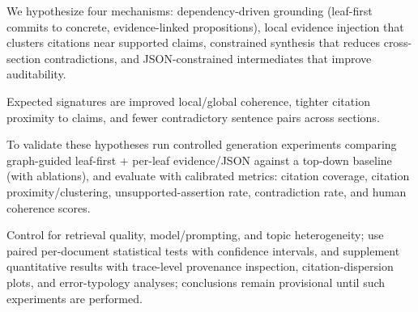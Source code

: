 We hypothesize four mechanisms: dependency-driven grounding (leaf-first commits to concrete, evidence-linked propositions), local evidence injection that clusters citations near supported claims, constrained synthesis that reduces cross-section contradictions, and JSON-constrained intermediates that improve auditability.

Expected signatures are improved local/global coherence, tighter citation proximity to claims, and fewer contradictory sentence pairs across sections.

To validate these hypotheses run controlled generation experiments comparing graph-guided leaf-first + per-leaf evidence/JSON against a top-down baseline (with ablations), and evaluate with calibrated metrics: citation coverage, citation proximity/clustering, unsupported-assertion rate, contradiction rate, and human coherence scores.

Control for retrieval quality, model/prompting, and topic heterogeneity; use paired per-document statistical tests with confidence intervals, and supplement quantitative results with trace-level provenance inspection, citation-dispersion plots, and error-typology analyses; conclusions remain provisional until such experiments are performed.